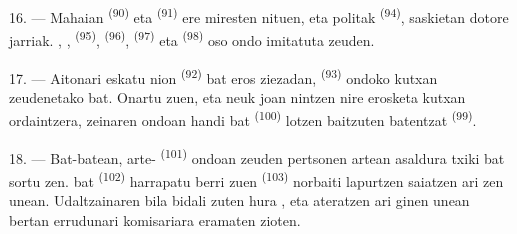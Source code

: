 16. --- Mahaian  \textsuperscript{(90)} eta 
\textsuperscript{(91)} ere miresten nituen, eta  politak
\textsuperscript{(94)}, saskietan dotore jarriak. ,
,  \textsuperscript{(95)},
 \textsuperscript{(96)}, 
\textsuperscript{(97)} eta  \textsuperscript{(98)} oso ondo
imitatuta zeuden.

\VUsaut{4.4mm}
\VUsaut{2.8mm}

17. --- Aitonari eskatu nion 
\textsuperscript{(92)} bat eros ziezadan, 
\textsuperscript{(93)} ondoko kutxan zeudenetako bat. Onartu zuen, eta neuk joan
nintzen nire erosketa kutxan ordaintzera, zeinaren ondoan  handi
bat \textsuperscript{(100)} lotzen baitzuten  batentzat
\textsuperscript{(99)}.

18. --- Bat-batean, arte- \textsuperscript{(101)} ondoan zeuden
pertsonen artean asaldura txiki bat sortu zen.  bat
\textsuperscript{(102)} harrapatu berri zuen 
\textsuperscript{(103)} norbaiti lapurtzen saiatzen ari zen unean. Udaltzainaren
bila bidali zuten hura , eta ateratzen ari ginen unean bertan
errudunari komisariara eramaten zioten.
\VUsaut{6.0mm}
\VUfilet{22mm}
